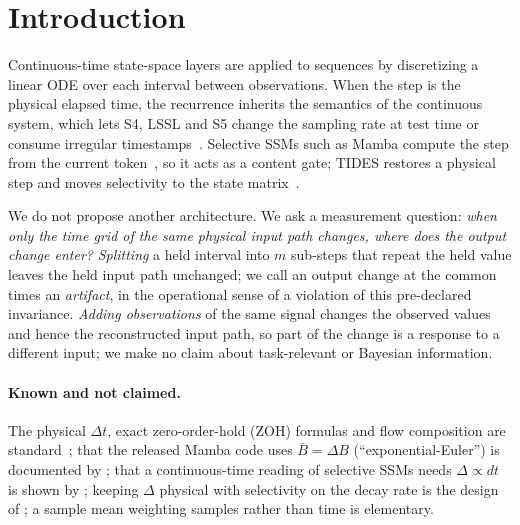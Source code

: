 \documentclass{article}
\theoremstyle{plain}
\theoremstyle{definition}
\theoremstyle{remark}
\begin{document}
\section{Introduction}
\label{sec:intro}

Continuous-time state-space layers are applied to sequences by discretizing a linear ODE over each interval between observations.
When the step is the physical elapsed time, the recurrence inherits the semantics of the continuous system, which lets S4, LSSL and S5 change the sampling rate at test time or consume irregular timestamps~\citep{gu2021s4,gu2021lssl,smith2022s5}.
Selective SSMs such as Mamba compute the step from the current token~\citep{gu2023mamba,dao2024mamba2}, so it acts as a content gate; TIDES restores a physical step and moves selectivity to the state matrix~\citep{soydan2026tides}.

We do not propose another architecture.
We ask a measurement question: \emph{when only the time grid of the same physical input path changes, where does the output change enter?}
\emph{Splitting} a held interval into $m$ sub-steps that repeat the held value leaves the held input path unchanged; we call an output change at the common times an \emph{artifact}, in the operational sense of a violation of this pre-declared invariance.
\emph{Adding observations} of the same signal changes the observed values and hence the reconstructed input path, so part of the change is a response to a different input; we make no claim about task-relevant or Bayesian information.

\paragraph{Known and not claimed.}
The physical $\Delta t$, exact zero-order-hold (ZOH) formulas and flow composition are standard~\citep{gu2021lssl,smith2022s5}; that the released Mamba code uses $\bar B=\Delta B$ (``exponential-Euler'') is documented by \citet{lahoti2026mamba3}; that a continuous-time reading of selective SSMs needs $\Delta\propto dt$ is shown by \citet{cirone2024theoretical}; keeping $\Delta$ physical with selectivity on the decay rate is the design of \citet{soydan2026tides}; a sample mean weighting samples rather than time is elementary.
\end{document}
